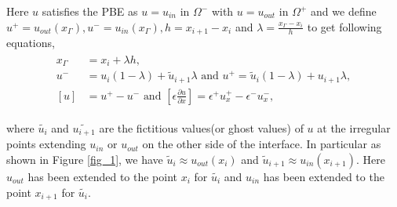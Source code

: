 Here $u$ satisfies the PBE as $u = u_{in} \text{ in }\Omega^-$ with $ u= u_{out}\text{ in }\Omega^+$
and we define $u^+ = u_{out}(x_\Gamma),u^- = u_{in}(x_\Gamma),h=x_{i+1}-x_i$ and  $\lambda =\frac{x_\Gamma-x_i}{h}$ to get following equations,
\begin{eqnarray}
\begin{aligned}
x_\Gamma &= x_i + \lambda h,  \\
u^- &= u_i(1-\lambda )+ \tilde{u}_{i+1} \lambda \text{ and }u^+ = \tilde{u}_i(1-\lambda )+ u_{i+1}\lambda,\\
\left[u\right]  & = u^+-u^- \text{ and }\left[ \epsilon \frac{\partial u}{\partial x} \right] =  \epsilon^+ u^+_x-\epsilon^- u^-_x,
\end{aligned}\label{1d_GFM}
\end{eqnarray}
	
where $\tilde{u_i}$ and $\tilde{u_{i+1}}$ are the fictitious values(or ghost values) of $u$ at the irregular points extending $u_{in}$ or $u_{out}$ on the other side of the interface. In particular as shown in Figure \ref{fig_1},  we have $\tilde{u}_i \approx u_{out}(x_i)$ and $\tilde{u}_{i+1}\approx u_{in}(x_{i+1})$. Here $u_{out}$ has been extended to the point $x_i$ for $\tilde{u_i}$ and $u_{in}$ has been extended to the point $x_{i+1}$ for $\tilde{u_i}$. 


